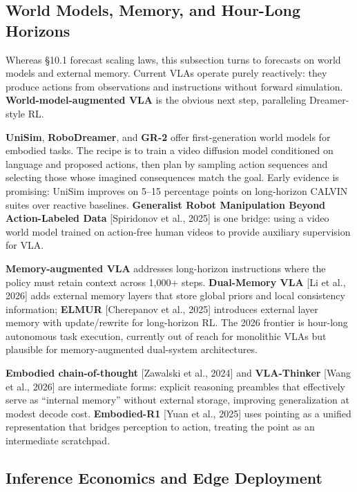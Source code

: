 \subsection{World Models, Memory, and Hour-Long Horizons}\label{world-models-memory-and-hour-long-horizons}

Whereas §10.1 forecast scaling laws, this subsection turns to forecasts on world models and external memory. Current VLAs operate purely reactively: they produce actions from observations and instructions without forward simulation. \textbf{World-model-augmented VLA} is the obvious next step, paralleling Dreamer-style RL.

\textbf{UniSim}, \textbf{RoboDreamer}, and \textbf{GR-2} offer first-generation world models for embodied tasks. The recipe is to train a video diffusion model conditioned on language and proposed actions, then plan by sampling action sequences and selecting those whose imagined consequences match the goal. Early evidence is promising: UniSim improves on 5--15 percentage points on long-horizon CALVIN suites over reactive baselines. \textbf{Generalist Robot Manipulation Beyond Action-Labeled Data} {[}Spiridonov et al., 2025{]} is one bridge: using a video world model trained on action-free human videos to provide auxiliary supervision for VLA.

\textbf{Memory-augmented VLA} addresses long-horizon instructions where the policy must retain context across 1,000+ steps. \textbf{Dual-Memory VLA} {[}Li et al., 2026{]} adds external memory layers that store global priors and local consistency information; \textbf{ELMUR} {[}Cherepanov et al., 2025{]} introduces external layer memory with update/rewrite for long-horizon RL. The 2026 frontier is hour-long autonomous task execution, currently out of reach for monolithic VLAs but plausible for memory-augmented dual-system architectures.

\textbf{Embodied chain-of-thought} {[}Zawalski et al., 2024{]} and \textbf{VLA-Thinker} {[}Wang et al., 2026{]} are intermediate forms: explicit reasoning preambles that effectively serve as ``internal memory'' without external storage, improving generalization at modest decode cost. \textbf{Embodied-R1} {[}Yuan et al., 2025{]} uses pointing as a unified representation that bridges perception to action, treating the point as an intermediate scratchpad.

\subsection{Inference Economics and Edge Deployment}\label{inference-economics-and-edge-deployment}

